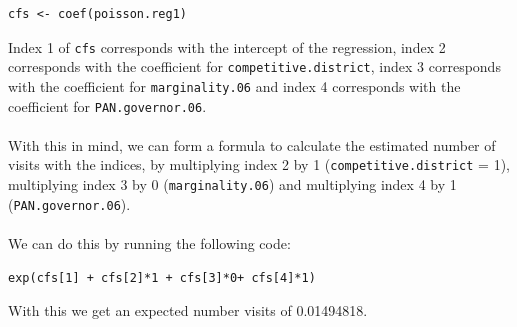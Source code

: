 \documentclass[12pt,letterpaper]{article}
\begin{document}
\begin{lstlisting}
cfs <- coef(poisson.reg1)
\end{lstlisting}

\noindent Index 1 of \texttt{cfs} corresponds with the intercept of the regression, index 2 corresponds with the coefficient for \texttt{competitive.district}, index 3 corresponds with the coefficient for \texttt{marginality.06} and index 4 corresponds with the coefficient for \texttt{PAN.governor.06}.
\\\\
\noindent With this in mind, we can form a formula to calculate the estimated number of visits with the indices, by multiplying index 2 by 1 (\texttt{competitive.district} = 1), multiplying index 3 by 0 (\texttt{marginality.06}) and multiplying index 4 by 1 (\texttt{PAN.governor.06}).
\\\\
\noindent We can do this by running the following code:

\begin{lstlisting}
exp(cfs[1] + cfs[2]*1 + cfs[3]*0+ cfs[4]*1)
\end{lstlisting}

\noindent With this we get an expected number visits of 0.01494818.
\\
\end{document}
